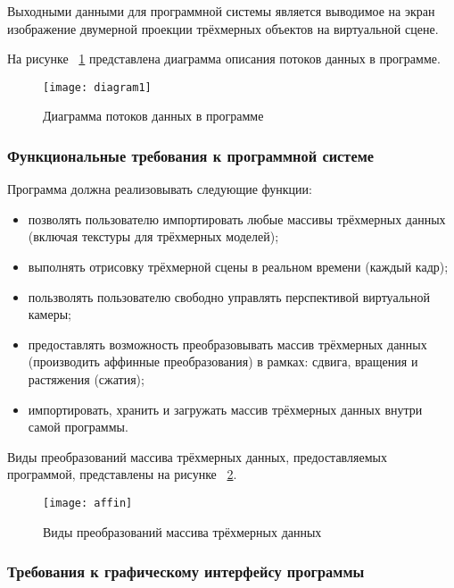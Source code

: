 Выходными данными для программной системы является выводимое на экран изображение двумерной проекции трёхмерных объектов на виртуальной сцене.

На рисунке ~\ref{diagram1:image} представлена диаграмма описания потоков данных в программе.

\begin{figure}[ht]
	\texttt{[image: diagram1]}
	\caption{Диаграмма потоков данных в программе}
	\label{diagram1:image}
\end{figure}

\subsubsection{Функциональные требования к программной системе}

Программа должна реализовывать следующие функции:
\begin{itemize}
    \item позволять пользователю импортировать любые массивы трёхмерных данных (включая текстуры для трёхмерных моделей);
    \item выполнять отрисовку трёхмерной сцены в реальном времени (каждый кадр);
    \item пользволять пользователю свободно управлять перспективой виртуальной камеры;
    \item предоставлять возможность преобразовывать массив трёхмерных данных (производить аффинные преобразования) в рамках: сдвига, вращения и растяжения (сжатия);
    \item импортировать, хранить и загружать массив трёхмерных данных внутри самой программы.
\end{itemize}



Виды преобразований массива трёхмерных данных, предоставляемых программой, представлены на рисунке ~\ref{affin:image}.

\begin{figure}[ht]
\texttt{[image: affin]}
\caption{Виды преобразований массива трёхмерных данных}
\label{affin:image}
\end{figure}

\subsubsection{Требования к графическому интерфейсу программы}

